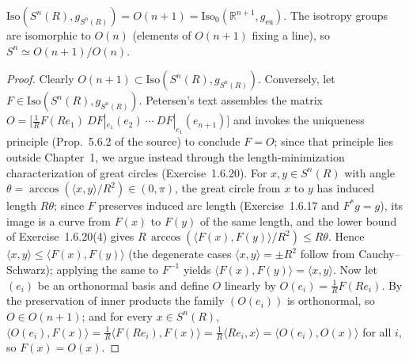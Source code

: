 \begin{example}
  \label{ex:pet-ch1-isometry-group-sphere}
  \leanok
  $\mathrm{Iso}(S^n(R),g_{S^n(R)})=O(n+1)=\mathrm{Iso}_0(\mathbb{R}^{n+1},g_{\mathrm{eu}})$.
  The isotropy groups are isomorphic to $O(n)$ (elements of $O(n+1)$ fixing a
  line), so $S^n\simeq O(n+1)/O(n)$.
\end{example}
\begin{proof}
  \leanok
  Clearly $O(n+1)\subset\mathrm{Iso}(S^n(R),g_{S^n(R)})$. Conversely, let
  $F\in\mathrm{Iso}(S^n(R),g_{S^n(R)})$. Petersen's text assembles the matrix
  $O=\big[\tfrac1RF(Re_1)\ DF|_{e_1}(e_2)\ \cdots\ DF|_{e_1}(e_{n+1})\big]$ and
  invokes the uniqueness principle (Prop.\ 5.6.2 of the source) to conclude
  $F=O$; since that principle lies outside Chapter~1, we argue instead through
  the length-minimization characterization of great circles
  (Exercise~1.6.20). For $x,y\in S^n(R)$ with angle
  $\theta=\arccos(\langle x,y\rangle/R^2)\in(0,\pi)$, the great circle from
  $x$ to $y$ has induced length $R\theta$; since $F$ preserves induced arc
  length (Exercise~1.6.17 and $F^*g=g$), its image is a curve from $F(x)$ to
  $F(y)$ of the same length, and the lower bound of Exercise~1.6.20(4) gives
  $R\,\arccos(\langle F(x),F(y)\rangle/R^2)\le R\theta$. Hence
  $\langle x,y\rangle\le\langle F(x),F(y)\rangle$ (the degenerate cases
  $\langle x,y\rangle=\pm R^2$ follow from Cauchy--Schwarz); applying the
  same to $F^{-1}$ yields $\langle F(x),F(y)\rangle=\langle x,y\rangle$.
  Now let $(e_i)$ be an orthonormal basis and define $O$ linearly by
  $O(e_i)=\tfrac1R F(Re_i)$. By the preservation of inner products the family
  $(O(e_i))$ is orthonormal, so $O\in O(n+1)$; and for every $x\in S^n(R)$,
  $\langle O(e_i),F(x)\rangle=\tfrac1R\langle F(Re_i),F(x)\rangle
  =\tfrac1R\langle Re_i,x\rangle=\langle O(e_i),O(x)\rangle$ for all $i$,
  so $F(x)=O(x)$.
\end{proof}

